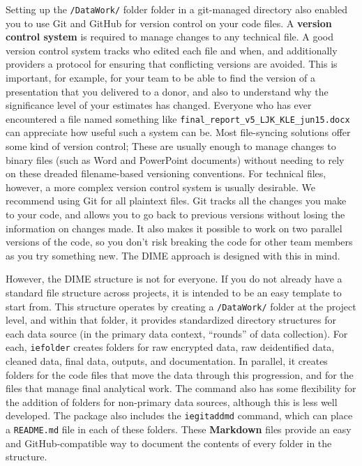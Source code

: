 Setting up the \texttt{/DataWork/} folder folder in a git-managed directory
also enabled you to use Git and GitHub for version control on your code files.
A \textbf{version control system} is required to manage changes to any technical file.
A good version control system tracks who edited each file and when,
and additionally providers a protocol for ensuring that conflicting versions are avoided.
This is important, for example, for your team to be able to find the version of a presentation that you delivered to a donor,
and also to understand why the significance level of your estimates has changed.
Everyone who has ever encountered a file named something like \texttt{final\_report\_v5\_LJK\_KLE\_jun15.docx}
can appreciate how useful such a system can be.
Most file-syncing solutions offer some kind of version control;
These are usually enough to manage changes to binary files (such as Word and PowerPoint documents)
without needing to rely on these dreaded filename-based versioning conventions.
For technical files, however, a more complex version control system is usually desirable.
We recommend using Git
for all plaintext files.
Git tracks all the changes you make to your code,
and allows you to go back to previous versions without losing the information on changes made.
It also makes it possible to work on two parallel versions of the code,
so you don't risk breaking the code for other team members as you try something new.
The DIME approach is designed with this in mind.

However, the DIME structure is not for everyone.
If you do not already have a standard file structure across projects,
it is intended to be an easy template to start from.
This structure operates by creating a \texttt{/DataWork/} folder at the project level,
and within that folder, it provides standardized directory structures
for each data source (in the primary data context, ``rounds'' of data collection).
For each, \texttt{iefolder} creates folders for raw encrypted data,
raw deidentified data, cleaned data, final data, outputs, and documentation.
In parallel, it creates folders for the code files
that move the data through this progression,
and for the files that manage final analytical work.
The command also has some flexibility for the addition of
folders for non-primary data sources, although this is less well developed.
The package also includes the \texttt{iegitaddmd} command,
which can place a \texttt{README.md} file in each of these folders.
These \textbf{Markdown} files provide an easy and GitHub-compatible way
to document the contents of every folder in the structure.

